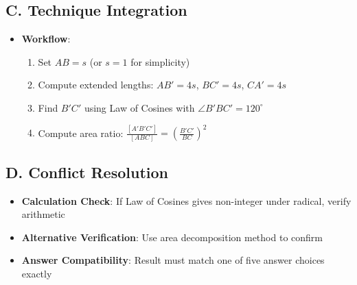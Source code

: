 \documentclass[11pt]{article}
\begin{document}
\begin{techniquesbox}
\subsection*{C. Technique Integration}
\begin{itemize}[leftmargin=*]
    \item \textbf{Workflow}: 
    \begin{enumerate}
        \item Set $AB = s$ (or $s = 1$ for simplicity)
        \item Compute extended lengths: $AB' = 4s$, $BC' = 4s$, $CA' = 4s$
        \item Find $B'C'$ using Law of Cosines with $\angle B'BC' = 120^{\circ}$
        \item Compute area ratio: $\frac{[A'B'C']}{[ABC]} = \left(\frac{B'C'}{BC}\right)^2$
    \end{enumerate}
\end{itemize}

\subsection*{D. Conflict Resolution}
\begin{itemize}[leftmargin=*]
    \item \textbf{Calculation Check}: If Law of Cosines gives non-integer under radical, verify arithmetic
    \item \textbf{Alternative Verification}: Use area decomposition method to confirm
    \item \textbf{Answer Compatibility}: Result must match one of five answer choices exactly
\end{itemize}
\end{techniquesbox}
\end{document}

